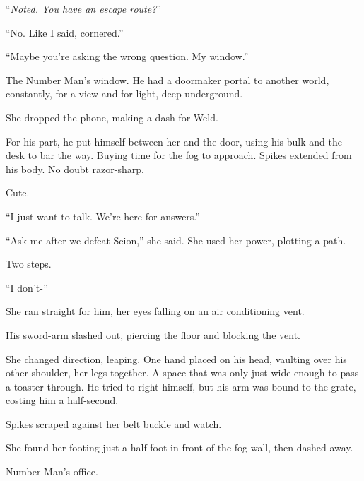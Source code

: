 ``\emph{Noted.  You have an escape route?}''



``No.  Like I said, cornered.''



``Maybe you're asking the wrong question.  My window.''



The Number Man's window.  He had a doormaker portal to another world, constantly, for a view and for light, deep underground.



She dropped the phone, making a dash for Weld.



For his part, he put himself between her and the door, using his bulk and the desk to bar the way.  Buying time for the fog to approach.  Spikes extended from his body.  No doubt razor-sharp.



Cute.



``I just want to talk.  We're here for answers.''



``Ask me after we defeat Scion,'' she said.  She used her power, plotting a path.



Two steps.



``I don't-''



She ran straight for him, her eyes falling on an air conditioning vent.



His sword-arm slashed out, piercing the floor and blocking the vent.



She changed direction, leaping.  One hand placed on his head, vaulting over his other shoulder, her legs together.  A space that was only just wide enough to pass a toaster through.  He tried to right himself, but his arm was bound to the grate, costing him a half-second.



Spikes scraped against her belt buckle and watch.



She found her footing just a half-foot in front of the fog wall, then dashed away.



Number Man's office.



